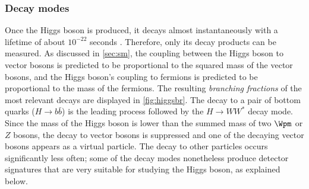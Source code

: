 \subsubsection{Decay modes}
Once the Higgs boson is produced, it decays almost instantaneously with a lifetime of about $10^{-22}$ seconds \cite{PDG2020}.
Therefore, only its decay products can be measured.
As discussed in \cref{sec:sm}, the coupling between the Higgs boson to vector bosons is predicted to be proportional to the squared mass of the vector bosons, and the Higgs boson's coupling to fermions is predicted to be proportional to the mass of the fermions. The resulting \emph{branching fractions} of the most relevant decays are displayed in \cref{fig:higgsbr}. 
The decay to a pair of bottom quarks ($H\rightarrow b\bar{b}$) is the leading process followed by the $H\rightarrow WW^*$ decay mode. Since the mass of the Higgs boson is lower than the summed mass of two $\Wpm$ or $Z$ bosons, the decay to vector bosons is suppressed and one of the decaying vector bosons appears as a virtual particle. The decay to other particles occurs significantly less often; some of the decay modes nonetheless produce detector signatures that are very suitable for studying the Higgs boson, as explained below.

